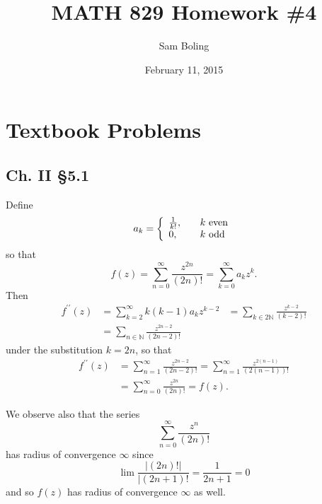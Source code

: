 \documentclass{article}
\title{MATH 829 Homework \#4}
\date{February 11, 2015}
\author{Sam Boling}
\newcounter{Problem}
\begin{document}
\begin{titlepage}
\maketitle
\end{titlepage}

\section{Textbook Problems}

\subsection*{Ch. II \S 5.1}
Define
$$
a_k
=
\left\{\begin{array}{l l}
  \frac{1}{k!}, & \quad k \text{ even} \\
  0,            & \quad k \text{ odd}
\end{array}\right.
$$
so that
$$
f(z) = \sum_{n=0}^{\infty} \frac{z^{2n}}{(2n)!} = \sum_{k=0}^\infty a_k z^k.
$$
Then
\begin{align*}
   f^{\prime\prime}(z)
&= \sum_{k=2}^\infty k (k-1) a_k z^{k-2}
&= \sum_{k \in 2\mathbb{N}} \frac{z^{k-2}}{(k-2)!} \\
&= \sum_{n \in \mathbb{N}} \frac{z^{2n - 2}}{(2n - 2)!}
\end{align*}
under the substitution $k = 2n$, so that
\begin{align*}
   f^{\prime\prime}(z)
&= \sum_{n=1}^\infty \frac{z^{2n - 2}}{(2n - 2)!}
 = \sum_{n=1}^\infty \frac{z^{2(n-1)}}{(2(n-1))!} \\
&= \sum_{n=0}^\infty \frac{z^{2n}}{(2n)!}
 = f(z).
\end{align*}

We observe also that the series
$$
\sum_{n=0}^{\infty} \frac{z^n}{(2n)!}
$$
has radius of convergence $\infty$ since
$$
\lim \frac{|(2n)!|}{|(2n+1)!} = \frac{1}{2n+1} = 0
$$
and so $f(z)$ has radius of convergence $\infty$ as well.
\end{document}
